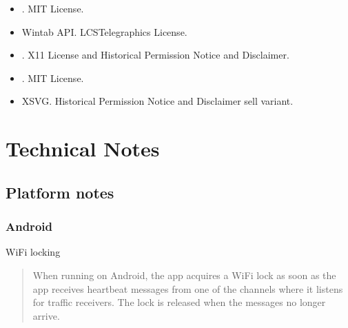 \documentclass[letterpaper,10pt,english]{sphinxmanual}
\begin{document}
\begin{itemize}
\item {} 
\sphinxAtStartPar
{}%
\begin{footnote}[81]\sphinxAtStartFootnote
{}
%
\end{footnote}. MIT License.

\item {} 
\sphinxAtStartPar
Wintab API. LCS\sphinxhyphen{}Telegraphics License.

\item {} 
\sphinxAtStartPar
{}%
\begin{footnote}[82]\sphinxAtStartFootnote
{}
%
\end{footnote}. X11 License and Historical Permission Notice and Disclaimer.

\item {} 
\sphinxAtStartPar
{}%
\begin{footnote}[83]\sphinxAtStartFootnote
{}
%
\end{footnote}. MIT License.

\item {} 
\sphinxAtStartPar
XSVG. Historical Permission Notice and Disclaimer \sphinxhyphen{} sell variant.

\end{itemize}


\chapter{Technical Notes}
\label{\detokenize{04-appendix/technical:technical-notes}}\label{\detokenize{04-appendix/technical::doc}}

\section{Platform notes}
\label{\detokenize{04-appendix/technical:platform-notes}}

\subsection{Android}
\label{\detokenize{04-appendix/technical:android}}
\sphinxAtStartPar
Wi\sphinxhyphen{}Fi locking
\begin{quote}

\sphinxAtStartPar
When running on Android, the app acquires a Wi\sphinxhyphen{}Fi lock as soon as the app
receives heartbeat messages from one of the channels where it listens for
traffic receivers.  The lock is released when the messages no longer arrive.
\end{quote}
\end{document}
